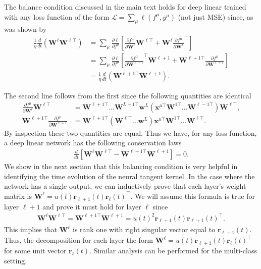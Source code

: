 \documentclass{article} %
\def\x{\bm x}
\begin{document}
\begin{appendix}
The balance condition discussed in the main text holds for deep linear trained with any loss function of the form $\mathcal{L} = \sum_\mu \ell(f^\mu,y^\mu)$ (not just MSE) since, as was shown by \cite{arora_cohen_linear_acc,Du2018AlgorithmicRI}
\begin{equation}
\begin{aligned}
    \frac{1}{\eta}\frac{d}{d t} \left(  \bm W^{\ell} \bm W^{\ell \top} \right)&= \sum_{\mu} \frac{\partial \ell}{\partial f^\mu} \left[ \frac{\partial f^\mu}{\partial \bm W^{\ell}} \bm W^{\ell \top} + \bm W^{\ell} \frac{\partial f^\mu}{\partial \bm W^{\ell}}^\top \right]
    \\
    &= \sum_{\mu} \frac{\partial \ell}{\partial f^\mu} \left[ \frac{\partial f^\mu}{\partial \bm W^{\ell+1}}^\top \bm W^{\ell+1} + \bm W^{\ell+1 \top} \frac{\partial f^\mu}{\partial \bm W^{\ell+1}} \right]\\
    &= \frac{1}{\eta} \frac{d}{d t} \left( \bm W^{\ell+1 \top} \bm W^{\ell+1} \right) .
\end{aligned}
\end{equation}

The second line follows from the first since the following quantities are identical
\begin{align}
    \frac{\partial f^\mu}{\partial \bm W^{\ell}} \bm W^{\ell \top} &= \bm W^{\ell+1 \top} ... \bm W^{L-1 \top}\bm w^L \left( \x^{\mu \top} \bm W^{1 \top} ... \bm W^{\ell-1 \top} \right) \bm W^{\ell \top},
    \\
    \bm W^{\ell+1 \top }\frac{\partial f^\mu}{\partial \bm W^{\ell+1}} &= \bm W^{\ell+1 \top} \left( \bm W^{\ell \top} ... \bm w^L \right) \x^{\mu\top} \bm W^{1\top} ... \bm W^{\ell \top}.
\end{align}
By inspection these two quantities are equal. Thus we have, for any loss function, a deep linear network has the following conservation laws
\begin{align}
    \frac{d}{dt} \left[ \bm W^{\ell} \bm W^{\ell\top} - \bm W^{\ell+1 \top} \bm W^{\ell+1} \right] = 0 .
\end{align}
We show in the next section that this balancing condition is very helpful in identifying the time evolution of the neural tangent kernel. In the case where the network has a single output, we can inductively prove that each layer's weight matrix is $\bm W^{\ell} = u(t) \bm r_{\ell+1}(t) \bm r_\ell(t)^\top$. We will assume this formula is true for layer $\ell+1$ and prove it must hold for layer $\ell$ since
\begin{align}
     \bm W^{\ell} \bm W^{\ell \top} = \bm W^{\ell + 1 \top} \bm W^{\ell+1} =  u(t)^2 \bm r_{\ell+1}(t) \bm r_{\ell+1}(t)^\top.
\end{align}
This implies that $\bm W^{\ell}$ is rank one with right singular vector equal to $\bm r_{\ell+1}(t)$. Thus, the decomposition for each layer the form $\bm W^{\ell} = u(t) \bm r_{\ell+1}(t) \bm r_{\ell}(t)^\top$ for some unit vector $\bm r_{\ell}(t)$. Similar analysis can be performed for the multi-class setting.



\end{appendix}
\end{document}
